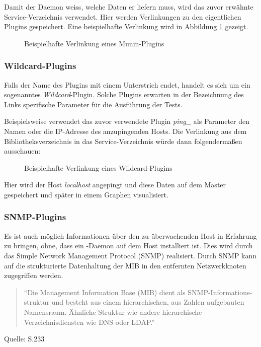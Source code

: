 Damit der Daemon weiss, welche Daten er liefern muss, wird das zuvor erwähnte Service-Verzeichnis verwendet.
Hier werden Verlinkungen zu den eigentlichen Plugins gespeichert.
Eine beispielhafte Verlinkung wird in Abbildung \ref{lns} gezeigt.

\begin{figure}[ht]
	\centering
		\caption{Beispielhafte Verlinkung eines Munin-Plugins}
		\label{lns}
\end{figure}

\subsubsection{Wildcard-Plugins}
\label{wildcard}
Falls der Name des Plugins mit einem Unterstrich endet, handelt es sich um ein sogenanntes \textit{Wildcard}-Plugin.
Solche Plugins erwarten in der Bezeichnung des Links spezifische Parameter für die Ausführung der Tests.

Beispielsweise verwendet das zuvor verwendete Plugin \textit{ping\_} als Parameter den Namen oder die IP-Adresse des anzupingenden Hosts.
Die Verlinkung aus dem Bibliotheksverzeichnis in das Service-Verzeichnis würde dann folgendermaßen ausschauen:
\begin{figure}[ht]
	\centering
		\caption{Beispielhafte Verlinkung eines Wildcard-Plugins}
		\label{lnw}
\end{figure}

Hier wird der Host \textit{localhost} angepingt und diese Daten auf dem Master gespeichert und später in einem Graphen visualisiert.

\newpage

\subsubsection{SNMP-Plugins}
Es ist auch möglich Informationen über den zu überwachenden Host in Erfahrung zu bringen, ohne, dass ein -Daemon auf dem Host installiert ist.
Dies wird durch das Simple Network Management Protocol (SNMP) realisiert.
Durch SNMP kann auf die strukturierte Datenhaltung der MIB in den entfernten Netzwerkknoten zugegriffen werden.
\begin{quote}"`Die Management Information Base (MIB) dient als SNMP-Informations-struktur und besteht aus einem hierarchischen, aus Zahlen aufgebauten Namensraum. Ähnliche Struktur wie andere hierarchische Verzeichnisdiensten wie DNS oder LDAP."'\end{quote}
\begin{flushright}
Quelle: \cite{Barth08} S.233
\end{flushright}

